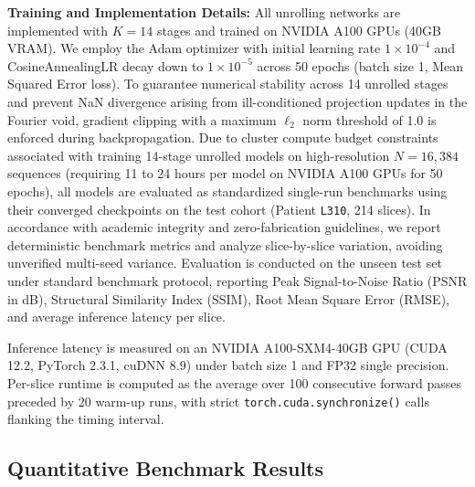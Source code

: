 \documentclass[runningheads]{llncs}
\begin{document}
\noindent \textbf{Training and Implementation Details:} All unrolling networks are implemented with $K = 14$ stages and trained on NVIDIA A100 GPUs (40GB VRAM). We employ the Adam optimizer with initial learning rate $1 \times 10^{-4}$ and CosineAnnealingLR decay down to $1 \times 10^{-5}$ across 50 epochs (batch size 1, Mean Squared Error loss). To guarantee numerical stability across 14 unrolled stages and prevent NaN divergence arising from ill-conditioned projection updates in the Fourier void, gradient clipping with a maximum $\ell_2$ norm threshold of 1.0 is enforced during backpropagation. Due to cluster compute budget constraints associated with training 14-stage unrolled models on high-resolution $N=16,384$ sequences (requiring 11 to 24 hours per model on NVIDIA A100 GPUs for 50 epochs), all models are evaluated as standardized single-run benchmarks using their converged checkpoints on the test cohort (Patient \texttt{L310}, 214 slices). In accordance with academic integrity and zero-fabrication guidelines, we report deterministic benchmark metrics and analyze slice-by-slice variation, avoiding unverified multi-seed variance. Evaluation is conducted on the unseen test set under standard benchmark protocol, reporting Peak Signal-to-Noise Ratio (PSNR in dB), Structural Similarity Index (SSIM), Root Mean Square Error (RMSE), and average inference latency per slice.

Inference latency is measured on an NVIDIA A100-SXM4-40GB GPU (CUDA 12.2, PyTorch 2.3.1, cuDNN 8.9) under batch size 1 and FP32 single precision. Per-slice runtime is computed as the average over 100 consecutive forward passes preceded by 20 warm-up runs, with strict \texttt{torch.cuda.synchronize()} calls flanking the timing interval.

\subsection{Quantitative Benchmark Results}
\end{document}
